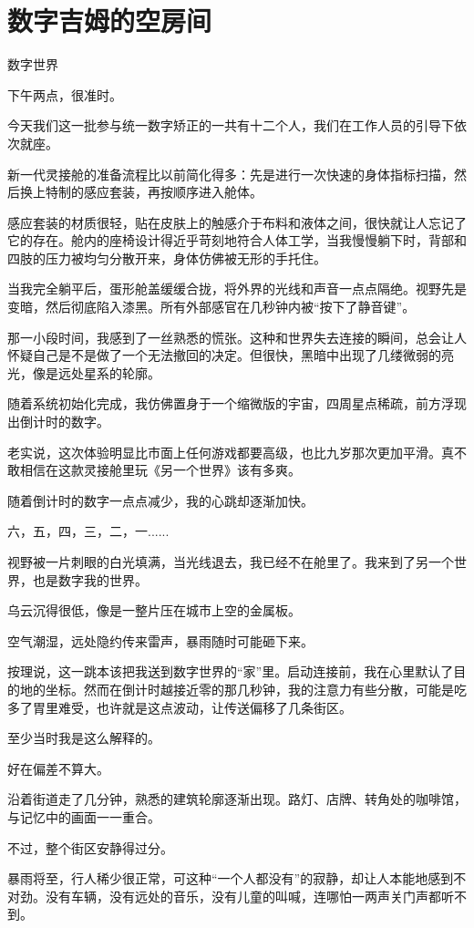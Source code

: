 \chapter{数字吉姆的空房间}

数字世界

下午两点，很准时。

今天我们这一批参与统一数字矫正的一共有十二个人，我们在工作人员的引导下依次就座。

新一代灵接舱的准备流程比以前简化得多：先是进行一次快速的身体指标扫描，然后换上特制的感应套装，再按顺序进入舱体。

感应套装的材质很轻，贴在皮肤上的触感介于布料和液体之间，很快就让人忘记了它的存在。舱内的座椅设计得近乎苛刻地符合人体工学，当我慢慢躺下时，背部和四肢的压力被均匀分散开来，身体仿佛被无形的手托住。

当我完全躺平后，蛋形舱盖缓缓合拢，将外界的光线和声音一点点隔绝。视野先是变暗，然后彻底陷入漆黑。所有外部感官在几秒钟内被“按下了静音键”。

那一小段时间，我感到了一丝熟悉的慌张。这种和世界失去连接的瞬间，总会让人怀疑自己是不是做了一个无法撤回的决定。但很快，黑暗中出现了几缕微弱的亮光，像是远处星系的轮廓。

随着系统初始化完成，我仿佛置身于一个缩微版的宇宙，四周星点稀疏，前方浮现出倒计时的数字。

老实说，这次体验明显比市面上任何游戏都要高级，也比九岁那次更加平滑。真不敢相信在这款灵接舱里玩《另一个世界》该有多爽。

随着倒计时的数字一点点减少，我的心跳却逐渐加快。

六，五，四，三，二，一......

视野被一片刺眼的白光填满，当光线退去，我已经不在舱里了。我来到了另一个世界，也是数字我的世界。

乌云沉得很低，像是一整片压在城市上空的金属板。

空气潮湿，远处隐约传来雷声，暴雨随时可能砸下来。

按理说，这一跳本该把我送到数字世界的“家”里。启动连接前，我在心里默认了目的地的坐标。然而在倒计时越接近零的那几秒钟，我的注意力有些分散，可能是吃多了胃里难受，也许就是这点波动，让传送偏移了几条街区。

至少当时我是这么解释的。

好在偏差不算大。

沿着街道走了几分钟，熟悉的建筑轮廓逐渐出现。路灯、店牌、转角处的咖啡馆，与记忆中的画面一一重合。

不过，整个街区安静得过分。

暴雨将至，行人稀少很正常，可这种“一个人都没有”的寂静，却让人本能地感到不对劲。没有车辆，没有远处的音乐，没有儿童的叫喊，连哪怕一两声关门声都听不到。

